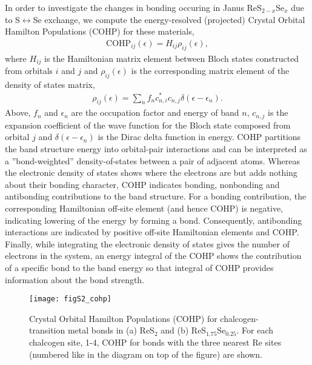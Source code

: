 \documentclass[superscriptaddress, amsmath,amssymb, preprint]{revtex4-2}
\begin{document}
In order to investigate the changes in bonding occuring in Janus ReS$_{2-x}$Se$_{x}$ due to S$\leftrightarrow$Se exchange, we compute the energy-resolved (projected) Crystal Orbital Hamilton Populations (COHP) \cite{dronskowski_jpc_1993} for these materials,
\begin{align}
\mathrm{COHP}_{ij}(\epsilon) = H_{ij}\rho_{ij}(\epsilon),
\end{align}
where $H_{ij}$ is the Hamiltonian matrix element between Bloch states constructed from orbitals $i$ and $j$ and $\rho_{ij}(\epsilon)$ is the corresponding matrix element of the density of states matrix,
\begin{align}
\rho_{ij}(\epsilon)=\sum_{n}f_{n}c_{n,i}^{*}c_{n,j}\delta(\epsilon-\epsilon_{n}).
\end{align}
Above, $f_{n}$ and $\epsilon_{n}$ are the occupation factor and energy of band $n$, $c_{n,j}$ is the expansion coefficient of the wave function for the Bloch state composed from orbital $j$ and $\delta(\epsilon-\epsilon_{n})$ is the Dirac delta function in energy. COHP partitions the band structure energy into orbital-pair interactions and can be interpreted as a ''bond-weighted'' density-of-states between a pair of adjacent atoms. Whereas the electronic density of states shows where the electrons are but adds nothing about their bonding character, COHP indicates bonding, nonbonding and antibonding contributions to the band structure. For a bonding contribution, the corresponding Hamiltonian off-site element (and hence COHP) is negative, indicating lowering of the energy by forming a bond. Consequently, antibonding interactions are indicated by positive off-site Hamiltonian elements and COHP. Finally, while integrating the electronic density of states gives the number of electrons in the system, an energy integral of the COHP shows the contribution of a specific bond to the band energy so that integral of COHP provides information about the bond strength.

\begin{figure}[t]
\begin{center}
\texttt{[image: figS2\_cohp]}
\caption{Crystal Orbital Hamilton Populations (COHP) for chalcogen-transition metal bonds in (a) ReS$_{2}$ and (b) ReS$_{1.75}$Se$_{0.25}$. For each chalcogen site, 1-4, COHP for bonds with the three nearest Re sites (numbered like in the diagram on top of the figure) are shown.}
\label{fig:cohp}
\end{center}
\end{figure}
\end{document}
